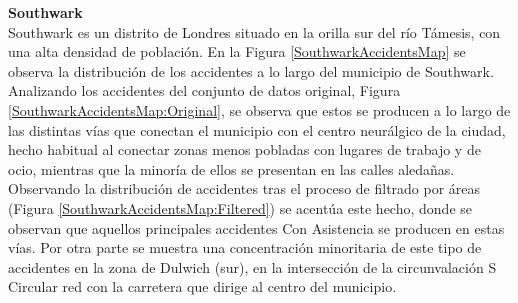 \documentclass{uathesis-es}
\begin{document}
{\textbf{Southwark}\\

Southwark es un distrito de Londres situado en la orilla sur del río Támesis, con una alta densidad de población. En la Figura \ref{SouthwarkAccidentsMap} se observa la distribución de los accidentes a lo largo del municipio de Southwark. Analizando los accidentes del conjunto de datos original, Figura \ref{SouthwarkAccidentsMap:Original}, se observa que estos se producen a lo largo de las distintas vías que conectan el municipio con el centro neurálgico de la ciudad, hecho habitual al conectar zonas menos pobladas con lugares de trabajo y de ocio, mientras que la minoría de ellos se presentan en las calles aledañas. Observando la distribución de accidentes tras el proceso de filtrado por áreas (Figura \ref{SouthwarkAccidentsMap:Filtered}) se acentúa este hecho, donde se observan que aquellos principales accidentes Con Asistencia se producen en estas vías. Por otra parte se muestra una concentración minoritaria de este tipo de accidentes en la zona de Dulwich (sur), en la intersección de la circunvalación S Circular red con la carretera que dirige al centro del municipio.


}
\end{document}

